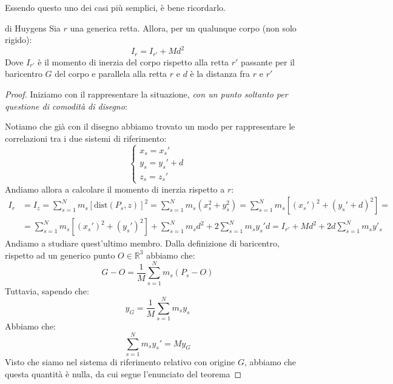 \documentclass[11pt,a4paper,twoside]{article}
\theoremstyle{definition}
\begin{document}
Essendo questo uno dei casi più semplici, è bene ricordarlo.

\begin{thm}{di Huygens}{}
	Sia $r$ una generica retta. Allora, per un qualunque corpo (non solo rigido):
	\[ I_r = I_{r'} + Md^2 \]
	Dove $I_{r'}$ è il momento di inerzia del corpo rispetto alla retta $r'$ passante per il baricentro $G$ del corpo e parallela alla retta $r$ e $d$ è la distanza fra $r$ e $r'$
\end{thm}

\begin{proof}
	Iniziamo con il rappresentare la situazione, \textit{con un punto soltanto per questione di comodità di disegno}:
	\begin{center}
	\end{center}
	Notiamo che già con il disegno abbiamo trovato un modo per rappresentare le correlazioni tra i due sistemi di riferimento:
	\[ \begin{cases}
		x_s = x_s'\\
		y_s = y_s' + d\\
		z_s = z_s'
	\end{cases} \]
	Andiamo allora a calcolare il momento di inerzia rispetto a $r$:
	\begin{align*}
		I_r &= I_z = \sum_{s = 1}^N m_s[\text{dist}(P_s,z)]^2 = \sum_{s=1}^N m_s(x_s^2 + y^2_s) = \sum_{s=1}^N m_s[(x_s')^2 + (y_s'+d)^2] =\\
		&= \sum_{s=1}^N m_s[(x_s')^2 + (y_s')^2] + \sum_{s=1}^N m_sd^2 +2\sum_{s=1}^Nm_s y_s' d = I_{r'} + Md^2 + 2d\sum_{s = 1}^N m_sy'_s
	\end{align*}
	Andiamo a studiare quest'ultimo membro. Dalla definizione di baricentro, rispetto ad un generico punto $O \in \mathbb R^3$ abbiamo che:
	\[ G-O = \frac 1M \sum_{s=1}^N m_s(P_s-O) \]
	Tuttavia, sapendo che:
	\[ y_G = \frac 1M \sum_{s = 1}^N m_s y_s \]
	Abbiamo che:
	\[ \sum_{s=1}^N m_sy_s' = My_G\]
	Visto che siamo nel sistema di riferimento relativo con origine $G$, abbiamo che questa quantità è nulla, da cui segue l'enunciato del teorema
\end{proof}
\end{document}
